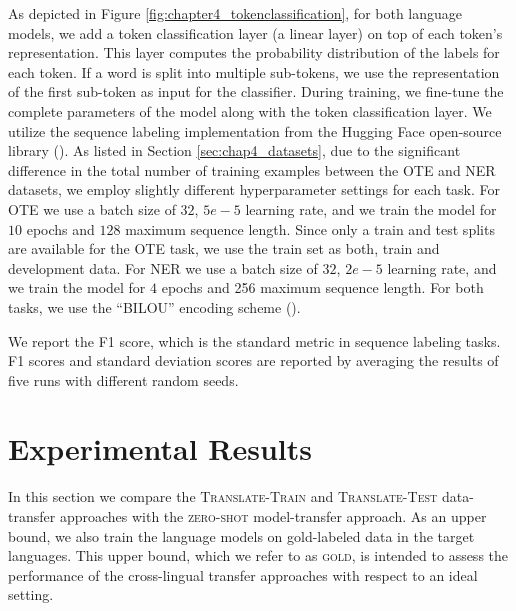 As depicted in Figure \ref{fig:chapter4_tokenclassification}, for both language models, we add a token classification layer (a linear layer) on top of each token's representation. This layer computes the probability distribution of the labels for each token. If a word is split into multiple sub-tokens, we use the representation of the first sub-token as input for the classifier. During training, we fine-tune the complete parameters of the model along with the token classification layer. We utilize the sequence labeling implementation from the Hugging Face open-source library (\cite{wolf-etal-2020-huggingface-transformers}). As listed in Section \ref{sec:chap4_datasets}, due to the significant difference in the total number of training examples between the OTE and NER datasets, we employ slightly different hyperparameter settings for each task. For OTE we use a batch size of $32$, $5e-5$ learning rate, and we train the model for $10$ epochs and $128$ maximum sequence length. Since only a train and test splits are available for the OTE task, we use the train set as both, train and development data. For NER we use a batch size of $32$, $2e-5$ learning rate, and we train the model for $4$ epochs and 256 maximum sequence length. For both tasks, we use the ``BILOU'' encoding scheme (\cite{ratinov-roth-2009-design}). 

We report the F1 score, which is the standard metric in sequence labeling tasks. F1 scores and standard deviation scores are reported by averaging the results of five runs with different random seeds. 

\section{Experimental Results}
\label{sec:chap4_experiments}
In this section we compare the \textsc{Translate-Train} and \textsc{Translate-Test} data-transfer approaches with the \textsc{zero-shot} model-transfer approach. As an upper bound, we also train the language models on gold-labeled data in the target languages. This upper bound, which we refer to as \textsc{gold}, is intended to assess the performance of the cross-lingual transfer approaches with respect to an ideal setting.

